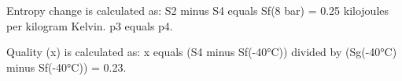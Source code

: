 Entropy change is calculated as:  
S2 minus S4 equals Sf(8 bar) = 0.25 kilojoules per kilogram Kelvin.  
p3 equals p4.  

Quality (x) is calculated as:  
x equals (S4 minus Sf(-40°C)) divided by (Sg(-40°C) minus Sf(-40°C)) = 0.23.